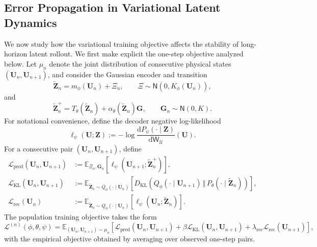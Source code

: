\documentclass[11pt]{article}
\renewcommand{\d}{\mathrm{d}}
\begin{document}
\subsection{Error Propagation in Variational Latent Dynamics}
\label{sec:err_var_dyn}
We now study how the variational training objective affects the stability of long-horizon latent rollout. We first make explicit the one-step objective analyzed below. Let $\mu_n$ denote the joint distribution of consecutive physical states $(\mathbf U_n,\mathbf U_{n+1})$, and consider the Gaussian encoder and transition
\[
    \widetilde{\mathbf Z}_n=m_\phi(\mathbf U_n)+\Xi_n,
    \qquad
    \Xi\sim\mathsf N(0,K_\phi(\mathbf U_n)),
\]
and
\[
    \widetilde{\mathbf Z}_n^+=T_\theta(\widetilde{\mathbf Z}_n)+\alpha_\theta(\widetilde{\mathbf Z}_n)\mathbf G,
    \qquad
    \mathbf G_n\sim\mathsf N(0,K).
\]
For notational convenience, define the decoder negative log-likelihood
\[
    \ell_\psi(\mathbf U;\mathbf Z)
    := -\log\frac{\d P_\psi(\cdot\mid\mathbf Z)}{\d\mathsf W_{\mathcal U}}(\mathbf U).
\]
For a consecutive pair $(\mathbf U_n,\mathbf U_{n+1})$, define
\begin{align*}
    \mathcal L_{\mathrm{pred}}(\mathbf U_n,\mathbf U_{n+1})
    &:=\mathbb E_{\Xi_n,\mathbf G_n}
    \left[\ell_\psi(\mathbf U_{n+1};\widetilde{\mathbf Z}_n^+)\right],
    \\
    \mathcal L_{\mathrm{KL}}(\mathbf U_n,\mathbf U_{n+1})
    &:=\mathbb E_{\widetilde{\mathbf Z}_n\sim
        Q_\phi(\cdot\mid\mathbf U_n)}
    \left[D_{\mathrm{KL}}\left(
        Q_\phi(\cdot\mid\mathbf U_{n+1})\,\Vert\,P_\theta(\cdot\mid\widetilde{\mathbf Z}_n)
    \right)\right],
    \\
    \mathcal L_{\mathrm{rec}}(\mathbf U_n)
    &:=\mathbb E_{\widetilde{\mathbf Z}_n\sim Q_\phi(\cdot\mid\mathbf U_n)}
    \left[
        \ell_\psi(\mathbf U_n;\widetilde{\mathbf Z}_n)
    \right].
\end{align*}
The population training objective takes the form
\begin{equation}
    \mathcal L^{(n)}(\phi,\theta,\psi)
    =\mathbb E_{(\mathbf U_n,\mathbf U_{n+1})\sim\mu_n}
    \left[
        \mathcal L_{\mathrm{pred}}(\mathbf U_n,\mathbf U_{n+1})
        +\beta\mathcal L_{\mathrm{KL}}(\mathbf U_n,\mathbf U_{n+1})
        +\lambda_{\mathrm{rec}}\mathcal L_{\mathrm{rec}}(\mathbf U_{n+1})
    \right],
    \label{eq:functional_training_objective}
\end{equation}
with the empirical objective obtained by averaging over observed one-step pairs.
\end{document}
